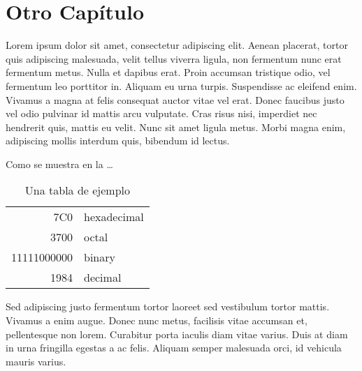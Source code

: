 



\chapter{Otro Capítulo}
\label{cha:otro_capitulo}

\ifpdf
    \graphicspath{{2_another_chapter/figures/PNG/}{2_another_chapter/figures/PDF/}{2_another_chapter/figures/}}
\else
    \graphicspath{{2_another_chapter/figures/EPS/}{2_another_chapter/figures/}}
\fi



Lorem ipsum dolor sit amet, consectetur adipiscing elit. Aenean placerat, tortor
quis adipiscing malesuada, velit tellus viverra ligula, non fermentum nunc erat
fermentum metus. Nulla et dapibus erat. Proin accumsan tristique odio, vel
fermentum leo porttitor in. Aliquam eu urna turpis. Suspendisse ac eleifend
enim. Vivamus a magna at felis consequat auctor vitae vel erat. Donec faucibus
justo vel odio pulvinar id mattis arcu vulputate. Cras risus nisi, imperdiet nec
hendrerit quis, mattis eu velit. Nunc sit amet ligula metus. Morbi magna enim,
adipiscing mollis interdum quis, bibendum id lectus. 

Como se muestra en la  \ldots

\begin{table}
\center
\caption{Una tabla de ejemplo}
\begin{tabular}{|r|l|}
  \hline
  7C0 & hexadecimal \\
  3700 & octal \\ \cline{2-2}
  11111000000 & binary \\
  \hline \hline
  1984 & decimal \\
  \hline
\end{tabular}
\label{tab:example}
\end{table}

Sed adipiscing justo fermentum tortor laoreet sed vestibulum tortor mattis.
Vivamus a enim augue. Donec nunc metus, facilisis vitae accumsan et,
pellentesque non lorem. Curabitur porta iaculis diam vitae varius. Duis at diam
in urna fringilla egestas a ac felis. Aliquam semper malesuada orci, id vehicula
mauris varius.


